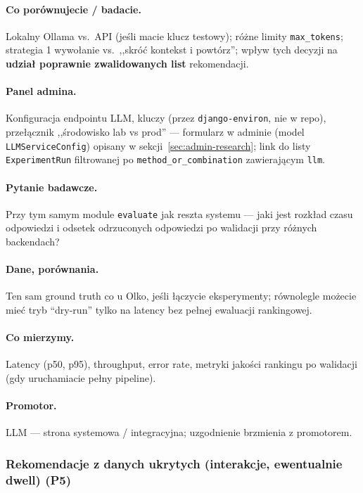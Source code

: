 \documentclass[a4paper,11pt]{article}
\newcommand{\code}[1]{\texttt{\small #1}}
\begin{document}
\paragraph{Co porównujecie / badacie.}
Lokalny Ollama vs.\ API (jeśli macie klucz testowy); różne limity \code{max\_tokens}; strategia 1 wywołanie vs.\ ,,skróć kontekst i powtórz''; wpływ tych decyzji na \textbf{udział poprawnie zwalidowanych list} rekomendacji.

\paragraph{Panel admina.}
Konfiguracja endpointu LLM, kluczy (przez \code{django-environ}, nie w repo), przełącznik ,,środowisko lab vs prod'' --- formularz w adminie (model \code{LLMServiceConfig}) opisany w sekcji~\ref{sec:admin-research}; link do listy \code{ExperimentRun} filtrowanej po \texttt{method\_or\_combination} zawierającym \texttt{llm}.

\paragraph{Pytanie badawcze.}
Przy tym samym module \texttt{evaluate} jak reszta systemu --- jaki jest rozkład czasu odpowiedzi i odsetek odrzuconych odpowiedzi po walidacji przy różnych backendach?

\paragraph{Dane, porównania.}
Ten sam ground truth co u Olko, jeśli łączycie eksperymenty; równolegle możecie mieć tryb ``dry-run'' tylko na latency bez pełnej ewaluacji rankingowej.

\paragraph{Co mierzymy.}
Latency (p50, p95), throughput, error rate, metryki jakości rankingu po walidacji (gdy uruchamiacie pełny pipeline).

\paragraph{Promotor.}
LLM --- strona systemowa / integracyjna; uzgodnienie brzmienia z promotorem.

\subsubsection{Rekomendacje z danych ukrytych (interakcje, ewentualnie dwell) (\textbf{P5})}
\end{document}
